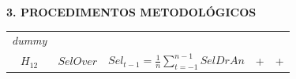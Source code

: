 \documentclass[ignorenonframetext,aspectratio=169,ignorenonframetext]{beamer}
\begin{document}
\begin{frame}{\textbf{3. PROCEDIMENTOS METODOLÓGICOS}}
\begin{longtable}[]{@{}cllcc@{}}
\begin{minipage}[t]{0.11\columnwidth}
\emph{dummy}\strut
\end{minipage}\tabularnewline
\begin{minipage}[t]{0.11\columnwidth}\centering
\(H_{12}\)\strut
\end{minipage} & \begin{minipage}[t]{0.15\columnwidth}\raggedright
\(SelOver\)\strut
\end{minipage} & \begin{minipage}[t]{0.39\columnwidth}\raggedright
\(Sel_{t-1} = \frac{1}{n}\sum_{t=-1}^{n-1}SelDrAn\)\strut
\end{minipage} & \begin{minipage}[t]{0.11\columnwidth}\centering
+\strut
\end{minipage} & \begin{minipage}[t]{0.11\columnwidth}\centering
+\strut
\end{minipage}\tabularnewline
\bottomrule
\end{longtable}

\end{frame}
\end{document}
